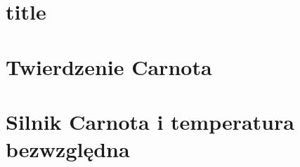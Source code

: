 \section{title}

\section{Twierdzenie Carnota}



\section{Silnik Carnota i temperatura bezwzględna}
